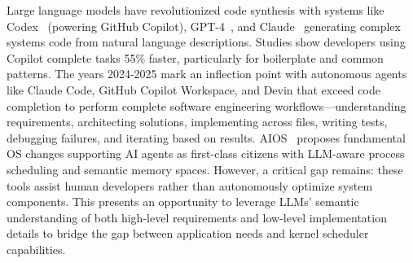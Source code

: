 Large language models have revolutionized code synthesis with systems like Codex~\cite{chen2021codex} (powering GitHub Copilot), GPT-4~\cite{openai2023gpt4}, and Claude~\cite{anthropic2024claude} generating complex systems code from natural language descriptions. Studies show developers using Copilot complete tasks 55\% faster, particularly for boilerplate and common patterns. The years 2024-2025 mark an inflection point with autonomous agents like Claude Code, GitHub Copilot Workspace, and Devin that exceed code completion to perform complete software engineering workflows—understanding requirements, architecting solutions, implementing across files, writing tests, debugging failures, and iterating based on results. AIOS~\cite{mei2024aios} proposes fundamental OS changes supporting AI agents as first-class citizens with LLM-aware process scheduling and semantic memory spaces. However, a critical gap remains: these tools assist human developers rather than autonomously optimize system components. This presents an opportunity to leverage LLMs' semantic understanding of both high-level requirements and low-level implementation details to bridge the gap between application needs and kernel scheduler capabilities.

